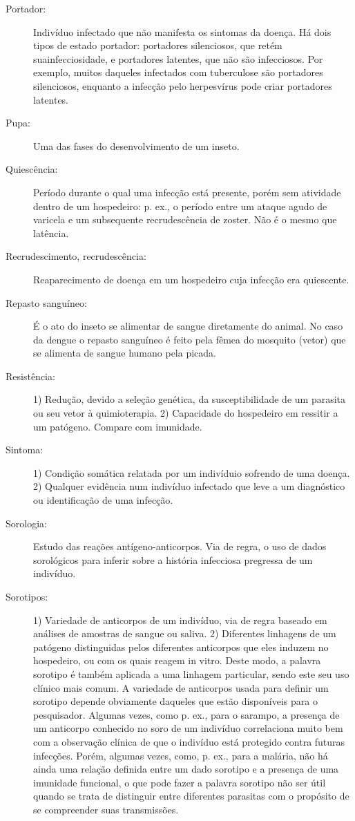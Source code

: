 \begin{description}
\item[Portador:] Indivíduo infectado que não manifesta os sintomas da doença. Há dois tipos de estado portador: portadores silenciosos, que retém suainfecciosidade, e portadores latentes, que não são infecciosos. Por exemplo, muitos daqueles infectados com tuberculose são portadores silenciosos, enquanto a infecção pelo herpesvírus pode criar portadores latentes.

\item[Pupa:] Uma das fases do desenvolvimento de um inseto.

\item[Quiescência:] Período durante o qual uma infecção está presente, porém sem atividade dentro de um hospedeiro: p. ex., o período entre um ataque agudo de varicela e um subsequente recrudescência de zoster. Não é o mesmo que latência.

\item[Recrudescimento, recrudescência:] Reaparecimento de doença em um hospedeiro cuja infecção era quiescente.

\item[Repasto sanguíneo:] É o ato do inseto se alimentar de sangue diretamente do animal. No caso da dengue o repasto sanguíneo é feito pela fêmea do mosquito (vetor) que se alimenta de sangue humano pela picada.

\item[Resistência:] 1) Redução, devido a seleção genética, da susceptibilidade de um parasita ou seu vetor à quimioterapia. 2) Capacidade do hospedeiro em ressitir a um patógeno. Compare com imunidade.

\item[Sintoma:] 1) Condição somática relatada por um indivíduio sofrendo de uma doença. 2) Qualquer evidência num indivíduo infectado que leve a um diagnóstico ou identificação de uma infecção.

\item[Sorologia:] Estudo das reações antígeno-anticorpos. Via de regra, o uso de dados sorológicos para inferir sobre a história infecciosa pregressa de um indivíduo.

\item[Sorotipos:] 1) Variedade de anticorpos de um indivíduo, via de regra baseado em análises de amostras de sangue ou saliva. 2) Diferentes linhagens de um patógeno distinguidas pelos diferentes anticorpos que eles induzem no hospedeiro, ou com os quais reagem in vitro. Deste modo, a palavra sorotipo é também aplicada a uma linhagem particular, sendo este seu uso clínico mais comum. A variedade de anticorpos usada para definir um sorotipo depende obviamente daqueles que estão disponíveis para o pesquisador. Algumas vezes, como p. ex., para o sarampo, a presença de um anticorpo conhecido no soro de um indivíduo correlaciona muito bem com a observação clínica de que o indivíduo está protegido contra futuras infecções. Porém, algumas vezes, como, p. ex., para a malária, não há ainda uma relação definida entre um dado sorotipo e a presença de uma imunidade funcional, o que pode fazer a palavra sorotipo não ser útil quando se trata de distinguir entre diferentes parasitas com o propósito de se compreender suas transmissões.


\end{description}
